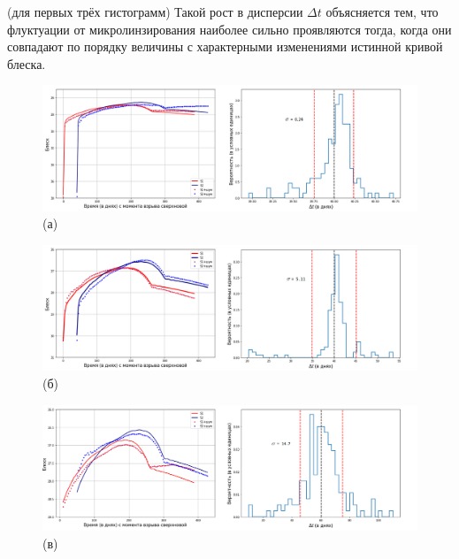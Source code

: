 (для первых трёх гистограмм) Такой рост в дисперсии $\Delta t$ объясняется тем, что флуктуации от микролинзирования наиболее сильно проявляются тогда, когда они совпадают по порядку величины с характерными изменениями истинной кривой блеска. 

\begin{figure}[H]
    \centering
	\begin{minipage}[h]{1.0\linewidth}
    \centering    
    	\includegraphics[scale=0.40]{pics/fig1.png} \\ \centering (а)  \\ 
	\end{minipage}
	\vfill
	\begin{minipage}[h]{1.0\linewidth}
	\centering
    	\includegraphics[scale=0.40]{pics/fig2.png} \\ \centering (б) \\
	\end{minipage}
	\vfill
	\begin{minipage}[h]{1.0\linewidth}
    \centering	
    	\includegraphics[scale=0.40]{pics/fig3.png} \\ \centering (в) \\
	\end{minipage}

\end{figure}
